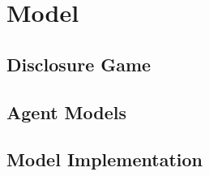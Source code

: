 \section{Model}
\label{sec:model}

\subsection{Disclosure Game}
\label{sub:the_game}


\subsection{Agent Models}
\label{sub:the_agents}

\subsection{Model Implementation}
\label{sub:the_code}
